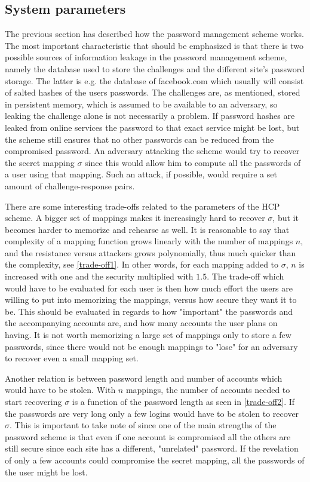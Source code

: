 \subsection{System parameters} \label{sec-params}
\par The previous section has described how the password management scheme works. The most important characteristic that should be emphasized is that there is two possible sources of information leakage in the password management scheme, namely the database used to store the challenges and the different site's password storage. The latter is e.g. the database of facebook.com which usually will consist of salted hashes of the users passwords. The challenges are, as mentioned, stored in persistent memory, which is assumed to be available to an adversary, so leaking the challenge alone is not necessarily a problem. If password hashes are leaked from online services the password to that exact service might be lost, but the scheme still ensures that no other passwords can be reduced from the compromised password. An adversary attacking the scheme would try to recover the secret mapping $\sigma$ since this would allow him to compute all the passwords of a user using that mapping. Such an attack, if possible, would require a set amount of challenge-response pairs. 
\par There are some interesting trade-offs related to the parameters of the HCP scheme. A bigger set of mappings makes it increasingly hard to recover $\sigma$, but it becomes  harder to memorize and rehearse as well. It is reasonable to say that complexity of a mapping function grows linearly with the number of mappings $n$, and the resistance versus attackers grows polynomially, thus much quicker than the complexity, see \autoref{trade-off1}. In other words, for each mapping added to $\sigma$, $n$ is increased with one and the security multiplied with $1.5$. The trade-off which would have to be evaluated for each user is then how much effort the users are willing to put into memorizing the mappings, versus how secure they want it to be. This should be evaluated in regards to how "important" the passwords and the accompanying accounts are, and how many accounts the user plans on having. It is not worth memorizing a large set of mappings only to store a few passwords, since there would not be enough mappings to "lose" for an adversary to recover even a small mapping set.
\par Another relation is between password length and number of accounts which would have to be stolen. With $n$ mappings, the number of accounts needed to start recovering $\sigma$ is a function of the password length as seen in \autoref{trade-off2}. If the passwords are very long only a few logins would have to be stolen to recover $\sigma$. This is important to take note of since one of the main strengths of the password scheme is that even if one account is compromised all the others are still secure since each site has a different, "unrelated" password. If the revelation of only a few accounts could compromise the secret mapping, all the passwords of the user might be lost.
